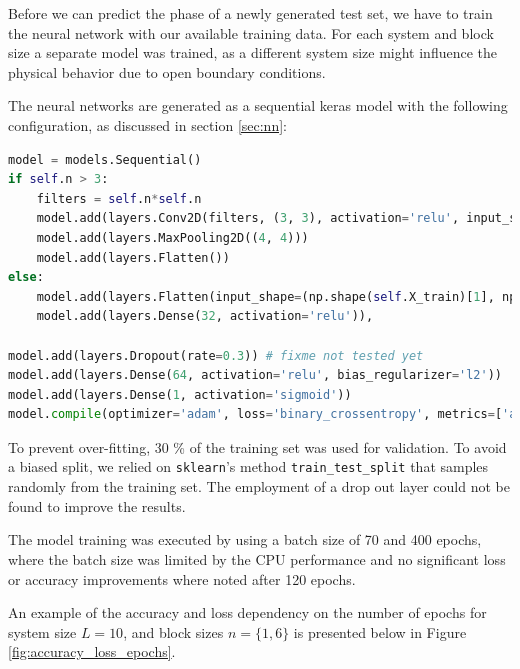 \documentclass[reprint,amsmath,amssymb,aps,prb]{revtex4-2}
\begin{document}
Before we can predict the phase of a newly generated test set, we have to train the neural network with our available training data. For each system and block size a separate model was trained, as a different system size might influence the physical behavior due to open boundary conditions.

The neural networks are generated as a sequential keras model with the following configuration, as discussed in section \ref{sec:nn}: 
\begin{lstlisting}[language=Python]
model = models.Sequential()
if self.n > 3:
	filters = self.n*self.n
	model.add(layers.Conv2D(filters, (3, 3), activation='relu', input_shape=(np.shape(self.X_train[0])[0], np.shape(self.X_train[0])[1], 2)))
	model.add(layers.MaxPooling2D((4, 4)))
	model.add(layers.Flatten())
else:
	model.add(layers.Flatten(input_shape=(np.shape(self.X_train)[1], np.shape(self.X_train)[1], 2)))
	model.add(layers.Dense(32, activation='relu')),

model.add(layers.Dropout(rate=0.3)) # fixme not tested yet
model.add(layers.Dense(64, activation='relu', bias_regularizer='l2'))
model.add(layers.Dense(1, activation='sigmoid'))
model.compile(optimizer='adam', loss='binary_crossentropy', metrics=['accuracy'])
\end{lstlisting}

To prevent over-fitting, $30$ \% of the training set was used for validation. To avoid a biased split, we relied on \texttt{sklearn}'s method \texttt{train\_test\_split} that samples randomly from the training set. The employment of a drop out layer could not be found to improve the results.
	
The model training was executed by using a batch size of 70 and 400 epochs, where the batch size was limited by the CPU performance and no significant loss or accuracy improvements where noted after 120 epochs.

An example of the accuracy and loss dependency on the number of epochs for system size $L=10$, and block sizes $n=\{1, 6\}$ is presented below in Figure \ref{fig:accuracy_loss_epochs}.
\end{document}

